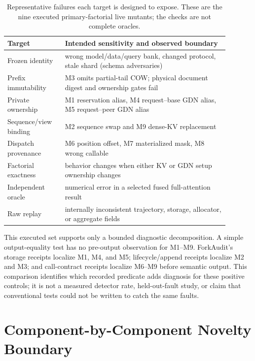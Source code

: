 \documentclass{article}
\begin{document}
\begin{table}[H]
\caption{Representative failures each target is designed to expose.  These are
the nine executed primary-factorial live mutants; the checks are not complete oracles.}
\centering\small
\begin{tabular}{@{}p{0.23\linewidth}p{0.66\linewidth}@{}}
\toprule
Target & Intended sensitivity and observed boundary \\
\midrule
Frozen identity & wrong model/data/query bank, changed protocol, stale shard (schema adversaries)\\
Prefix immutability & M3 omits partial-tail COW; physical document digest and ownership gates fail\\
Private ownership & M1 reservation alias, M4 request--base GDN alias, M5 request--peer GDN alias\\
Sequence/view binding & M2 sequence swap and M9 dense-KV replacement\\
Dispatch provenance & M6 position offset, M7 materialized mask, M8 wrong callable\\
Factorial exactness & behavior changes when either KV or GDN setup ownership changes\\
Independent oracle & numerical error in a selected fused full-attention result\\
Raw replay & internally inconsistent trajectory, storage, allocator, or aggregate fields\\
\bottomrule
\end{tabular}
\end{table}

This executed set supports only a bounded diagnostic decomposition.  A simple
output-equality test has no pre-output observation for M1--M9.  ForkAudit's
storage receipts localize M1, M4, and M5; lifecycle/append receipts localize
M2 and M3; and call-contract receipts localize M6--M9 before semantic output.
This comparison identifies which recorded predicate adds diagnosis for these
positive controls; it is not a measured detector rate, held-out-fault study, or
claim that conventional tests could not be written to catch the same faults.

\section{Component-by-Component Novelty Boundary}
\label{app:novelty-boundary}
\end{document}
